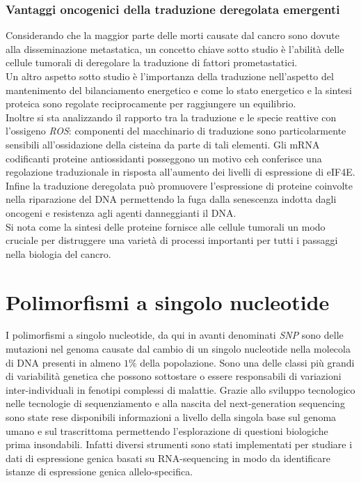 		\subsubsection{Vantaggi oncogenici della traduzione deregolata emergenti}
		Considerando che la maggior parte delle morti causate dal cancro sono dovute alla disseminazione metastatica, un concetto chiave sotto studio \`e l'abilit\`a delle cellule tumorali di deregolare la traduzione di fattori prometastatici.\\
		Un altro aspetto sotto studio \`e l'importanza della traduzione nell'aspetto del mantenimento del bilanciamento energetico e come lo stato energetico e la sintesi proteica sono regolate reciprocamente per raggiungere un equilibrio.\\
		Inoltre si sta analizzando il rapporto tra la traduzione e le specie reattive con l'ossigeno \emph{ROS}: componenti del macchinario di traduzione sono particolarmente sensibili all'ossidazione della cisteina da parte di tali elementi.
		Gli mRNA codificanti proteine antiossidanti posseggono un motivo ceh conferisce una regolazione traduzionale in risposta all'aumento dei livelli di espressione di eIF4E.\\
		Infine la traduzione deregolata pu\`o promuovere l'espressione di proteine coinvolte nella riparazione del DNA permettendo la fuga dalla senescenza indotta dagli oncogeni e resistenza agli agenti danneggianti il DNA.\\
		Si nota come la sintesi delle proteine fornisce alle cellule tumorali un modo cruciale per distruggere una variet\`a di processi importanti per tutti i passaggi nella biologia del cancro.


\section{Polimorfismi a singolo nucleotide}
I polimorfismi a singolo nucleotide, da qui in avanti denominati \emph{SNP} sono delle mutazioni nel genoma causate dal cambio di un singolo nucleotide nella molecola di DNA presenti in almeno $1\%$ della popolazione.
Sono una delle classi pi\`u grandi di variabilit\`a genetica che possono sottostare o essere responsabili di variazioni inter-individuali in fenotipi complessi di malattie.
Grazie allo sviluppo tecnologico nelle tecnologie di sequenziamento e alla nascita del next-generation sequencing sono state rese disponibili informazioni a livello della singola base sul genoma umano e sul trascrittoma permettendo l'esplorazione di questioni biologiche prima insondabili.
Infatti diversi strumenti sono stati implementati per studiare i dati di espressione genica basati su RNA-sequencing in modo da identificare istanze di espressione genica allelo-specifica.

